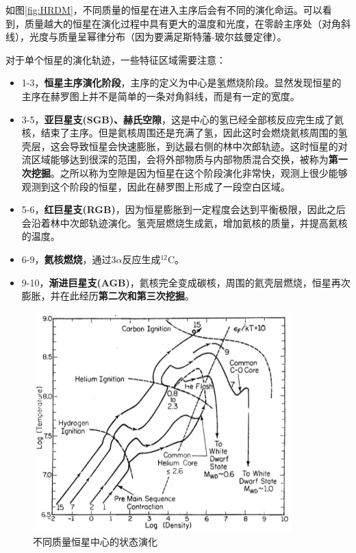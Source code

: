 \documentclass[openany]{ctexbook}
\begin{document}
如图\ref{fig:HRDM}，不同质量的恒星在进入主序后会有不同的演化命运。可以看到，质量越大的恒星在演化过程中具有更大的温度和光度，在零龄主序处（对角斜线），光度与质量呈幂律分布（因为要满足斯特藩-玻尔兹曼定律）。

对于单个恒星的演化轨迹，一些特征区域需要注意：
\begin{itemize}
  \item 1-3，\textbf{恒星主序演化阶段}，主序的定义为中心是氢燃烧阶段。显然发现恒星的主序在赫罗图上并不是简单的一条对角斜线，而是有一定的宽度。
  \item 3-5，\textbf{亚巨星支(SGB)、赫氏空隙}，这是中心的氢已经全部核反应完生成了氦核，结束了主序。但是氦核周围还是充满了氢，因此这时会燃烧氦核周围的氢壳层，这会导致恒星会快速膨胀，到达最右侧的林中次郎轨迹。这时恒星的对流区域能够达到很深的范围，会将外部物质与内部物质混合交换，被称为\textbf{第一次挖掘}。之所以称为空隙是因为恒星在这个阶段演化非常快，观测上很少能够观测到这个阶段的恒星，因此在赫罗图上形成了一段空白区域。
  \item 5-6，\textbf{红巨星支(RGB)}，因为恒星膨胀到一定程度会达到平衡极限，因此之后会沿着林中次郎轨迹演化。氢壳层燃烧生成氦，增加氦核的质量，并提高氦核的温度。
  \item 6-9，\textbf{氦核燃烧}，通过3$\alpha$反应生成$^{12}$C。
  \item 9-10，\textbf{渐进巨星支(AGB)}，氦核完全变成碳核，周围的氦壳层燃烧，恒星再次膨胀，并在此经历\textbf{第二次和第三次挖掘}。
\end{itemize}


\begin{figure}[hbt]
  \centering
  \includegraphics[width=10cm]{chapters/13/center}
  \caption{不同质量恒星中心的状态演化}
  \label{fig:center}
\end{figure}
\end{document}
